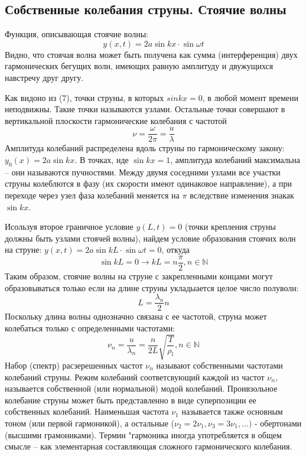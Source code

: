\documentclass[a4paper,12pt]{article} %
\begin{document}
\subsection{Собственные колебания струны. Стоячие волны}
Функция, описывающая стоячие волны:
\begin{equation}
y(x, t) = 2a \sin kx\cdot \sin\omega t
\end{equation}
Видно, что стоячая волна может быть получена как сумма (интерференция) двух гармонических бегущих волн, имеющих равную амплитуду и двужущихся навстречу друг другу.

Как видоно из (7), точки струны, в которых $sinkx = 0$, в любой момент времени неподвижны. Такие точки называются узлами. Остальные точки совершают в вертикальной плоскости гармонические колебания с частотой
\[\nu = \frac{\omega}{2\pi}=\frac{u}{\lambda}\]
Амплитуда колебаний распределена вдоль струны по гармоническому закону: $y_0(x) = 2a\sin kx$. В точках, нде $\sin kx = 1$, амплитуда колебаний максимальна -- они называются пучностями. Между двумя соседними узлами все участки струны колеблются в фазу (их скорости имеют одинаковое направление), а при переходе через узел фаза колебаний меняется на $\pi$ вследствие изменения знакак $\sin kx$.

Исользуя второе граничное условие $y(L, t)=0$ (точки крепления струны должны быть узлами стоячей волны), найдем условие образования стоячих волн на струне: $y(x, t) = 2a\sin kL\cdot \sin \omega t = 0$, откуда
\[\sin kL = 0 \rightarrow kL = n\frac{\pi}{2},  n\in \mathbb{N}\] 
Таким образом, стоячие волны на струне с закрепленными концами могут образовываться только если на длине струны укладыается целое число полуволн:
\begin{equation}
L = \frac{\lambda_n}{2}n
\end{equation}
Поскольку длина волны однозначно связана с ее частотой, струна может колебаться только с определенными частотами:
\begin{equation}
\nu_n = \frac{u}{\lambda_n}=\frac{n}{2L}\sqrt{\frac{T}{\rho_l}}, n\in \mathbb{N}
\end{equation}
Набор (спектр) расзерешенных частот $\nu_n$ называют собственными частотами колебаний струны. Режим колебаний соответсвующий каждой из частот $\nu_n$, называется собственной (или нормальной) модой колебаний. Проивзольное колебание струны может быть представленно в виде суперпозиции ее собственных колебаний. Наименьшая частота $\nu_1$ называется также основным тоном (или первой гармоникой), а остальные ($\nu_2 = 2\nu_1, \nu_3 = 3\nu_1, ...)$ - обертонами (высшими грамониками). Термин "гармоника иногда употребляется в общем смысле -- как элементарная составляющая сложного гармонического колебания.
\end{document}

